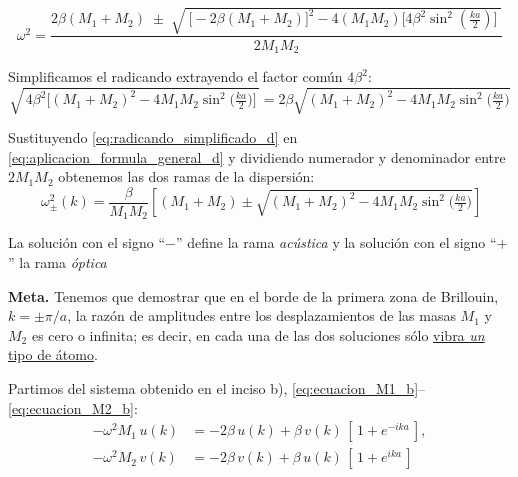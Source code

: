 \documentclass{article}
\begin{document}
\begin{equation}
\omega^{2}=\frac{2\beta(M_{1}+M_{2})\;\pm\;
\sqrt{\;\big[-2\beta(M_{1}+M_{2})\big]^{2}
-4(M_{1}M_{2})\big[4\beta^{2}\sin^{2}(\tfrac{ka}{2})\big]\;}}{2M_{1}M_{2}}
\label{eq:aplicacion_formula_general_d}
\end{equation}

Simplificamos el radicando extrayendo el factor común \(4\beta^{2}\):
\begin{equation}
\sqrt{\,4\beta^{2}\Big[(M_{1}+M_{2})^{2}-4M_{1}M_{2}\sin^{2}\!\Big(\tfrac{ka}{2}\Big)\Big]\,}
=2\beta\sqrt{(M_{1}+M_{2})^{2}-4M_{1}M_{2}\sin^{2}\!\Big(\tfrac{ka}{2}\Big)}
\label{eq:radicando_simplificado_d}
\end{equation}

Sustituyendo \eqref{eq:radicando_simplificado_d} en \eqref{eq:aplicacion_formula_general_d} y dividiendo numerador y denominador entre \(2M_{1}M_{2}\) obtenemos las dos ramas de la dispersión:
\begin{equation}
\boxed{\
\omega^{2}_{\pm}(k)=\frac{\beta}{M_{1}M_{2}}
\left[(M_{1}+M_{2})\pm
\sqrt{(M_{1}+M_{2})^{2}-4M_{1}M_{2}\sin^{2}\!\Big(\tfrac{ka}{2}\Big)}\right]
}
\label{eq:dispersion_d}
\end{equation}

\noindent
La solución con el signo “\(-\)” define la rama \emph{acústica} y la solución con el signo “\(+\)” la rama \emph{óptica}

\;

\textcolor{Sun}{\textbf{Meta.}} Tenemos que demostrar que en el borde de la primera zona de Brillouin,
\textcolor{vividviolet}{\textbf{\(k=\pm\pi/a\)}}, la razón de amplitudes entre los desplazamientos de las masas \(M_{1}\) y \(M_{2}\) es
cero o infinita; es decir, en cada una de las dos soluciones sólo \underline{vibra \emph{un} tipo de átomo}.

Partimos del sistema obtenido en el inciso b), \eqref{eq:ecuacion_M1_b}–\eqref{eq:ecuacion_M2_b}:
\begin{equation}
\begin{split}
-\omega^{2}M_{1}\,u(k) &= -2\beta\,u(k)+\beta\,v(k)\,[\,1+e^{-ika}\,],\\
-\omega^{2}M_{2}\,v(k) &= -2\beta\,v(k)+\beta\,u(k)\,[\,1+e^{ika}\,]
\end{split}
\label{eq:e_sistema_partida}
\end{equation}
\end{document}
